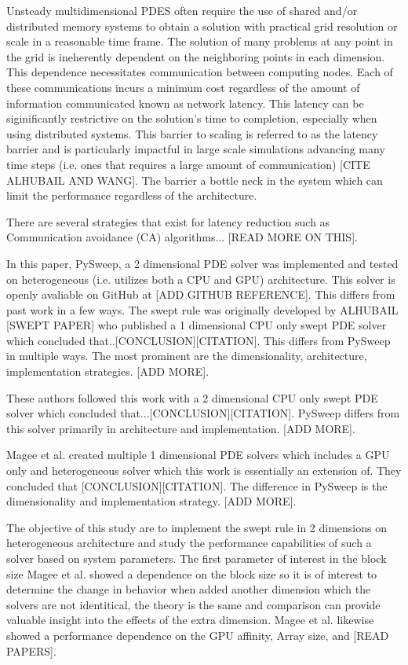 \documentclass[review]{elsarticle}
\begin{document}
Unsteady multidimensional PDES often require the use of shared and/or distributed memory systems to obtain a solution with practical grid resolution or scale in a reasonable time frame. The solution of many problems at any point in the grid is ineherently dependent on the neighboring points in each dimension. This dependence necessitates communication between computing nodes. Each of these communications incurs a minimum cost regardless of the amount of information communicated known as network latency.  This latency can be siginificantly restrictive on the solution's time to completion, especially when using distributed systems. This barrier to scaling is referred to as the latency barrier and is particularly impactful in large scale simulations advancing many time steps (i.e. ones that requires a large amount of communication) [CITE ALHUBAIL AND WANG]. The barrier a bottle neck in the system which can limit the performance regardless of the architecture.

\par
There are several strategies that exist for latency reduction such as Communication avoidance (CA) algorithms... [READ MORE ON THIS].


\par
In this paper, PySweep, a 2 dimensional PDE solver was implemented and tested on heterogeneous (i.e. utilizes both a CPU and GPU) architecture. This solver is openly avaliable on GitHub at [ADD GITHUB REFERENCE]. This differs from past work in a few ways. The swept rule was originally developed by ALHUBAIL [SWEPT PAPER] who published a 1 dimensional CPU only swept PDE solver which concluded that..[CONCLUSION][CITATION]. This differs from PySweep in multiple ways. The most prominent are the dimensionality, architecture, implementation strategies. [ADD MORE].

\par
These authors followed this work with a 2 dimensional CPU only swept PDE solver which concluded that...[CONCLUSION][CITATION]. PySweep differs from this solver primarily in architecture and implementation. [ADD MORE].

\par
Magee et al. created multiple 1 dimensional PDE solvers which includes a GPU only and heterogeneous solver which this work is essentially an extension of. They concluded that [CONCLUSION][CITATION]. The difference in PySweep is the dimensionality and implementation strategy. [ADD MORE].

\par
The objective of this study are to implement the swept rule in 2 dimensions on heterogeneous architecture and study the performance capabilities of such a solver based on system parameters. The first parameter of interest in the block size Magee et al. showed a dependence on the block size so it is of interest to determine the change in behavior when added another dimension which the solvers are not identitical, the theory is the same and comparison can provide valuable insight into the effects of the extra dimension. Magee et al. likewise showed a performance dependence on the GPU affinity, Array size, and [READ PAPERS].
\end{document}
